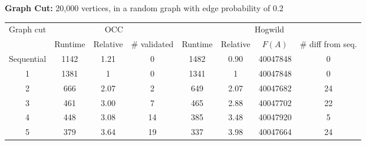 \documentclass{article} %
\begin{document}
\textbf{Graph Cut:} 20,000 vertices, in a random graph with edge probability of 0.2

\begin{tabular}{|c|c|c|c|c|c|c|c|}
\hline
\multirow{2}{*}{Graph cut} & \multicolumn{3}{c|}{OCC} & \multicolumn{4}{c|}{Hogwild}\\
 & Runtime & Relative & \# validated & Runtime & Relative & $F(A)$ & \# diff from seq.\\\hline
Sequential &	 1142 &	 1.21 &	 0 &	 1482 &	 0.90 &	 40047848 &	 0\\\hline
1&	 1381&	 1&	 0&	 1341&	 1&	 40047848&	 0\\\hline
2&	 666&	 2.07&	 2&	 649&	 2.07&	 40047682&	 24\\\hline
3&	 461&	 3.00&	 7&	 465&	 2.88&	 40047702&	 22\\\hline
4&	 448&	 3.08&	 14&	 385&	 3.48&	 40047920&	 5\\\hline
5&	 379&	 3.64&	 19&	 337&	 3.98&	 40047664&	 24\\\hline
\end{tabular}

{\footnotesize




}

\newpage
\appendix



\newpage
\end{document}
